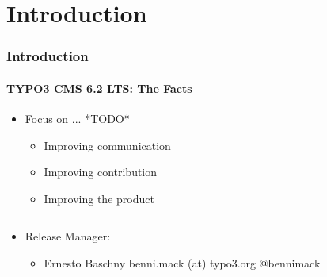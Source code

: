 %
%
%
%


\section{Introduction}
\begin{frame}[fragile]
	\frametitle{Introduction}
	\framesubtitle{TYPO3 CMS 6.2 LTS: The Facts}

	\begin{itemize}
		\item Focus on ... *TODO*
		\begin{itemize}
			\item Improving communication
			\item Improving contribution
			\item Improving the product
		\end{itemize}
	\end{itemize}

	\begin{columns}[T]

		\begin{column}{.5\textwidth}
			\begin{itemize}
				\item Release Manager:
				\begin{itemize}
					\item Ernesto Baschny\newline
						benni.mack (at) typo3.org\newline
						@bennimack
				\end{itemize}
			\end{itemize}
		\end{column}

		\begin{column}{.5\textwidth}
		\end{column}

	\end{columns}

\end{frame}

